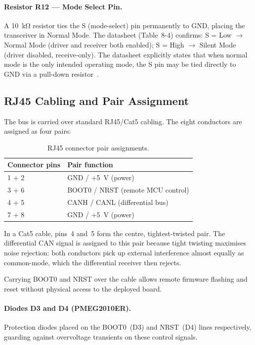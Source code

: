 \paragraph{Resistor R12 --- Mode Select Pin.}
A \SI{10}{\kilo\ohm} resistor ties the S (mode-select) pin permanently to GND, placing
the transceiver in Normal Mode. The datasheet (Table~8-4) confirms: S = Low $\rightarrow$
Normal Mode (driver and receiver both enabled); S = High $\rightarrow$ Silent Mode
(driver disabled, receive-only). The datasheet explicitly states that when normal mode is
the only intended operating mode, the S pin may be tied directly to GND via a pull-down
resistor~\cite{ref7}.

\subsection{RJ45 Cabling and Pair Assignment}
\label{subsec:rj45}

The bus is carried over standard RJ45/Cat5 cabling. The eight conductors are assigned as
four pairs:

\begin{table}[htbp]
  \centering
  \caption{RJ45 connector pair assignments.}
  \label{tab:rj45}
  \begin{tabular}{ll}
    \toprule
    Connector pins & Pair function \\
    \midrule
    1 + 2 & GND / +\SI{5}{\volt} (power) \\
    3 + 6 & BOOT0 / NRST (remote MCU control) \\
    4 + 5 & CANH / CANL (differential bus) \\
    7 + 8 & GND / +\SI{5}{\volt} (power) \\
    \bottomrule
  \end{tabular}
\end{table}

In a Cat5 cable, pins~4 and~5 form the centre, tightest-twisted pair. The differential
CAN signal is assigned to this pair because tight twisting maximises noise rejection:
both conductors pick up external interference almost equally as common-mode, which the
differential receiver then rejects.

Carrying BOOT0 and NRST over the cable allows remote firmware flashing and reset without
physical access to the deployed board.

\paragraph{Diodes D3 and D4 (PMEG2010ER).}
Protection diodes placed on the BOOT0~(D3) and NRST~(D4) lines respectively, guarding
against overvoltage transients on these control signals.

